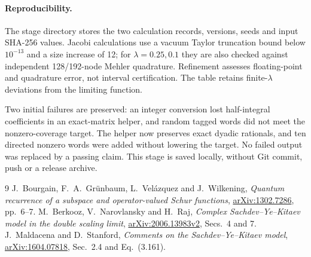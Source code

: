 \documentclass[11pt,a4paper]{article}
\begin{document}
\paragraph{Reproducibility.}
The stage directory stores the two calculation records, versions,
seeds and input SHA-256 values. Jacobi calculations use a vacuum
Taylor truncation bound below $10^{-13}$ and a size increase of 12;
for $\lambda=0.25,0.1$ they are also checked against independent
128/192-node Mehler quadrature. Refinement assesses floating-point
and quadrature error, not interval certification. The table retains
finite-$\lambda$ deviations from the limiting function.

Two initial failures are preserved: an integer conversion lost
half-integral coefficients in an exact-matrix helper, and random
tagged words did not meet the nonzero-coverage target. The helper
now preserves exact dyadic rationals, and ten directed nonzero words
were added without lowering the target. No failed output was replaced
by a passing claim. This stage is saved locally, without Git commit,
push or a release archive.

\begin{thebibliography}{9}
 J.~Bourgain, F.~A.~Gr\"unbaum, L.~Vel\'azquez
and J.~Wilkening, \emph{Quantum recurrence of a subspace and
operator-valued Schur functions},
\href{https://arxiv.org/abs/1302.7286}{arXiv:1302.7286}, pp.~6--7.
 M.~Berkooz, V.~Narovlansky and H.~Raj,
\emph{Complex Sachdev--Ye--Kitaev model in the double scaling limit},
\href{https://arxiv.org/abs/2006.13983v2}{arXiv:2006.13983v2},
Secs.~4 and 7.
 J.~Maldacena and D.~Stanford,
\emph{Comments on the Sachdev--Ye--Kitaev model},
\href{https://arxiv.org/abs/1604.07818}{arXiv:1604.07818},
Sec.~2.4 and Eq.~(3.161).
\end{thebibliography}
\end{document}
